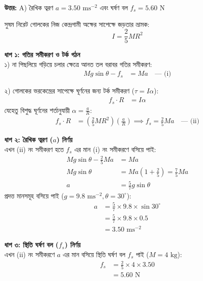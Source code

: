 \documentclass[12pt, a4paper]{article}
\begin{document}
\vspace{0.5em}
\begin{tcolorbox}[answerbox]
\textbf{\color{success} উত্তর:} A) রৈখিক ত্বরণ $a = 3.50\text{ ms}^{-2}$ এবং ঘর্ষণ বল $f_s = 5.60\text{ N}$
\end{tcolorbox}
\vspace{1em}

\begin{tcolorbox}[solutionbox={সমাধান (Solution)}]
\noindent
সুষম নিরেট গোলকের নিজ কেন্দ্রগামী অক্ষের সাপেক্ষে জড়তার ভ্রামক:
\[I = \frac{2}{5} M R^2\]

\textbf{ধাপ ১: গতির সমীকরণ ও টর্ক গঠন} \\
১) না পিছলিয়ে গড়িয়ে চলার ক্ষেত্রে আনত তল বরাবর গতির সমীকরণ:
\begin{align*}
    M g \sin\theta - f_s &= M a \quad \text{--- (i)}
\end{align*}

২) গোলকের ভরকেন্দ্রের সাপেক্ষে ঘূর্ণনের জন্য টর্ক সমীকরণ ($\tau = I \alpha$):
\begin{align*}
    f_s \cdot R &= I \alpha
\end{align*}
যেহেতু বিশুদ্ধ ঘূর্ণনের শর্তানুযায়ী $\alpha = \frac{a}{R}$:
\begin{align*}
    f_s \cdot R &= \left(\frac{2}{5} M R^2\right) \left(\frac{a}{R}\right) \implies f_s = \frac{2}{5} M a \quad \text{--- (ii)}
\end{align*}

\vspace{0.5em}
\textbf{ধাপ ২: রৈখিক ত্বরণ ($a$) নির্ণয়} \\
এখন (ii) নং সমীকরণ হতে $f_s$ এর মান (i) নং সমীকরণে বসিয়ে পাই:
\begin{align*}
    M g \sin\theta - \frac{2}{5} M a &= M a \\
    M g \sin\theta &= M a \left(1 + \frac{2}{5}\right) = \frac{7}{5} M a \\
    a &= \frac{5}{7} g \sin\theta
\end{align*}
প্রদত্ত মানসমূহ বসিয়ে পাই ($g = 9.8\text{ ms}^{-2}, \theta = 30^\circ$):
\begin{align*}
    a &= \frac{5}{7} \times 9.8 \times \sin 30^\circ \\
      &= \frac{5}{7} \times 9.8 \times 0.5 \\
      &= \mathbf{3.50}\text{ ms}^{-2}
\end{align*}

\vspace{0.5em}
\textbf{ধাপ ৩: স্থিতি ঘর্ষণ বল ($f_s$) নির্ণয়} \\
এখন (ii) নং সমীকরণে $a$ এর মান বসিয়ে স্থিতি ঘর্ষণ বল $f_s$ পাই ($M = 4\text{ kg}$):
\begin{align*}
    f_s &= \frac{2}{5} \times 4 \times 3.50 \\
        &= \mathbf{5.60}\text{ N}
\end{align*}
\end{tcolorbox}
\end{document}
